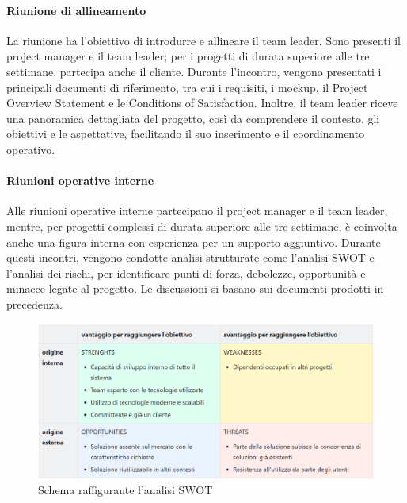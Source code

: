             \paragraph{Riunione di allineamento}
            La riunione ha l’obiettivo di introdurre e allineare il team leader. Sono
            presenti il project manager e il team leader; per i progetti di durata superiore alle tre settimane, partecipa
            anche il cliente.
            Durante l’incontro, vengono presentati i principali documenti di riferimento, tra cui i requisiti, i mockup,
            il Project Overview Statement e le Conditions of Satisfaction. Inoltre, il team leader riceve una panoramica
            dettagliata del progetto, così da comprendere il contesto, gli obiettivi e le aspettative, facilitando il
            suo inserimento e il coordinamento operativo.

            \paragraph{Riunioni operative interne}
            Alle riunioni operative interne partecipano il project manager e il team leader, mentre, per progetti
            complessi di durata superiore alle tre settimane, è coinvolta anche una figura interna con esperienza
            per un supporto aggiuntivo. Durante questi incontri, vengono condotte analisi strutturate come l'analisi SWOT
            e l’analisi dei rischi, per identificare punti di forza, debolezze, opportunità e minacce legate al progetto.
            Le discussioni si basano sui documenti prodotti in precedenza.

            \begin{figure}
                \centering
                \includegraphics[width=\linewidth]{figures/swot.png}
                \caption{Schema raffigurante l'analisi SWOT}
                \label{fig:swot}
            \end{figure}
